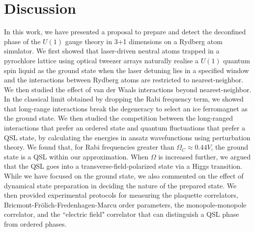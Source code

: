 \documentclass[twocolumn,superscriptaddress,amsmath,amssymb,aps,prx,nofootinbib]{revtex4-2}
\begin{document}
\section{Discussion}\label{sec:discussion}
In this work, we have presented a proposal to prepare and detect the deconfined phase of the $U(1)$ gauge theory in 3+1 dimensions on a Rydberg atom simulator. We first showed that laser-driven  neutral atoms trapped in a pyrochlore lattice using optical tweezer arrays naturally realise a $U(1)$ quantum spin liquid as the ground state when the laser detuning lies in a specified window and the interactions between Rydberg atoms are restricted to nearest-neighbor. We then studied the effect of van der Waals interactions beyond nearest-neighbor. In the classical limit obtained by dropping the Rabi frequency term, we showed that long-range interactions break the degeneracy to select an ice ferromagnet as the ground state. We then studied the competition between the long-ranged interactions that prefer an ordered state and quantum fluctuations that prefer a QSL state, by calculating the energies in ansatz wavefunctions using perturbation theory. We found that, for Rabi frequencies greater than $\Omega_C \approx 0.44 V$, the ground state is a QSL within our approximation. When $\Omega$ is increased further, we argued that the QSL goes into a transverse-field-polarized state via a Higgs transition. While we have focused on the ground state, we also commented on the effect of dynamical state preparation in deciding the nature of the prepared state. We then provided experimental protocols for measuring the plaquette correlators, Bricmont-Fr{\"o}lich-Fredenhagen-Marcu order parameters, the monopole-monopole correlator, and the ``electric field" correlator that can distinguish a QSL phase from ordered phases. 
\end{document}
